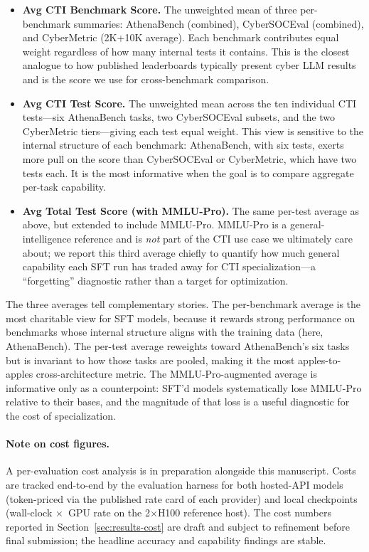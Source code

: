 \documentclass[unnumsec,webpdf,contemporary,large]{oup-authoring-template}
\theoremstyle{thmstyleone}
\theoremstyle{thmstyletwo}
\theoremstyle{thmstylethree}
\begin{document}
\begin{itemize}
  \item \textbf{Avg CTI Benchmark Score.} The unweighted mean of three per-benchmark summaries: AthenaBench (combined), CyberSOCEval (combined), and CyberMetric (2K+10K average). Each benchmark contributes equal weight regardless of how many internal tests it contains. This is the closest analogue to how published leaderboards typically present cyber LLM results and is the score we use for cross-benchmark comparison.
  \item \textbf{Avg CTI Test Score.} The unweighted mean across the ten individual CTI tests---six AthenaBench tasks, two CyberSOCEval subsets, and the two CyberMetric tiers---giving each test equal weight. This view is sensitive to the internal structure of each benchmark: AthenaBench, with six tests, exerts more pull on the score than CyberSOCEval or CyberMetric, which have two tests each. It is the most informative when the goal is to compare aggregate per-task capability.
  \item \textbf{Avg Total Test Score (with MMLU-Pro).} The same per-test average as above, but extended to include MMLU-Pro. MMLU-Pro is a general-intelligence reference and is \emph{not} part of the CTI use case we ultimately care about; we report this third average chiefly to quantify how much general capability each SFT run has traded away for CTI specialization---a ``forgetting'' diagnostic rather than a target for optimization.
\end{itemize}

The three averages tell complementary stories. The per-benchmark average is the most charitable view for SFT models, because it rewards strong performance on benchmarks whose internal structure aligns with the training data (here, AthenaBench). The per-test average reweights toward AthenaBench's six tasks but is invariant to how those tasks are pooled, making it the most apples-to-apples cross-architecture metric. The MMLU-Pro-augmented average is informative only as a counterpoint: SFT'd models systematically lose MMLU-Pro relative to their bases, and the magnitude of that loss is a useful diagnostic for the cost of specialization.

\paragraph{Note on cost figures.}
A per-evaluation cost analysis is in preparation alongside this manuscript. Costs are tracked end-to-end by the evaluation harness for both hosted-API models (token-priced via the published rate card of each provider) and local checkpoints (wall-clock $\times$~GPU rate on the 2$\times$H100 reference host). The cost numbers reported in Section~\ref{sec:results-cost} are draft and subject to refinement before final submission; the headline accuracy and capability findings are stable.
\end{document}

